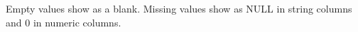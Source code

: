 \documentclass[12pt]{article}
\begin{document}
Empty values show as a blank. Missing values show as NULL in string columns and 0 in numeric columns. 

\end{document}
